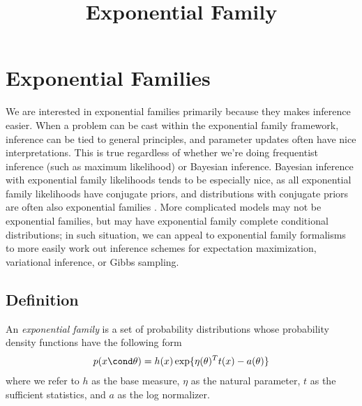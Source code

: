 \documentclass{article} %
\begin{document}
\title{Exponential Family} 

\maketitle
\tableofcontents
\newpage 

\section{Exponential Families} \label{sec:ef}

We are interested in  exponential families primarily because they makes inference easier.   When a problem can be cast within the exponential family framework,  inference can be tied to general principles,  and parameter updates often have nice interpretations.    This is true regardless of whether we're doing frequentist inference (such as maximum likelihood) or Bayesian inference.    Bayesian inference with exponential family likelihoods tends to be especially nice,  as all exponential family likelihoods have conjugate priors,  and distributions with conjugate priors are often also exponential families \cite{bernardo2009bayesian}.    More complicated models may not be exponential families,  but may have exponential family complete conditional distributions;  in such situation,  we can appeal to exponential family formalisms to more easily work out inference schemes for expectation maximization,  variational inference,  or Gibbs sampling.   

\subsection{Definition}
An \textit{exponential family} is a set of probability distributions whose probability density functions have the following form
\begin{align}
\label{eqn:exponential_family}
 p(x \cond \theta) = h(x) \exp \{ \eta(\theta)^T t(x) - a(\theta)\} 
 \end{align}
where we refer to $h$ as the base measure, $\eta$ as the natural parameter, $t$ as the sufficient statistics, and $a$ as the log normalizer.  
\end{document}
